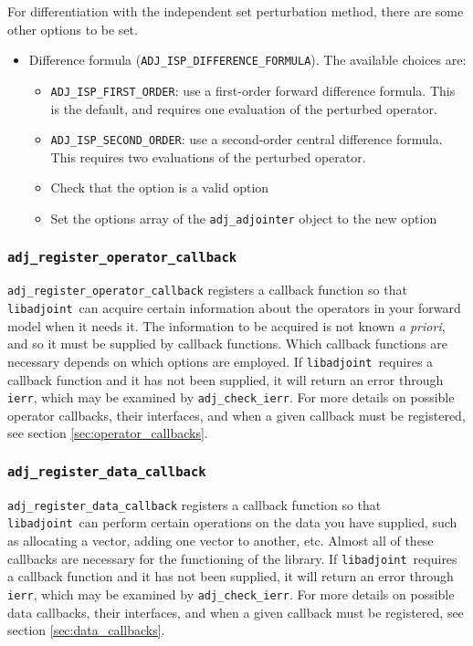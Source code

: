 \documentclass[10pt,authoryear]{elsarticle}
\newcommand{\libadjoint}[0]{{\texttt{libadjoint}}}
\begin{document}
For differentiation with the independent set perturbation method, there are some other options to be set.
\begin{itemize}
\item Difference formula (\texttt{ADJ\_ISP\_DIFFERENCE\_FORMULA}). The available choices are:
  \begin{itemize}
  \item \texttt{ADJ\_ISP\_FIRST\_ORDER}: use a first-order forward difference formula. This is the default, and requires one evaluation of the perturbed operator.
  \item \texttt{ADJ\_ISP\_SECOND\_ORDER}: use a second-order central difference formula. This requires two evaluations of the perturbed operator.
  \end{itemize}

  \begin{itemize}
  \item Check that the option is a valid option
  \item Set the options array of the \texttt{adj\_adjointer} object to the new option
  \end{itemize}
\end{itemize}

\subsubsection{\texttt{{adj\_register\_operator\_callback}}}
\texttt{adj\_register\_operator\_callback} registers a callback function so that \libadjoint\ can acquire
certain information about the operators in your forward model when it needs it. The information to be acquired is not known \emph{a priori}, and
so it must be supplied by callback functions. Which callback functions are necessary depends on which 
options are employed. If \libadjoint\ requires a callback function and it has not been supplied, it will
return an error through \texttt{ierr}, which may be examined by \texttt{adj\_check\_ierr}. For more details on possible operator callbacks,
their interfaces, and when a given callback must
be registered, see section \ref{sec:operator_callbacks}.

\subsubsection{\texttt{{adj\_register\_data\_callback}}}
\texttt{adj\_register\_data\_callback} registers a callback function so that \libadjoint\ can perform
certain operations on the data you have supplied, such as allocating a vector,
adding one vector to another, etc. Almost all of these callbacks are necessary for the functioning of
the library. If \libadjoint\ requires a callback function and it has not been supplied, it will
return an error through \texttt{ierr}, which may be examined by \texttt{adj\_check\_ierr}. For more details on possible data callbacks,
their interfaces, and when a given callback must
be registered, see section \ref{sec:data_callbacks}.
\end{document}
